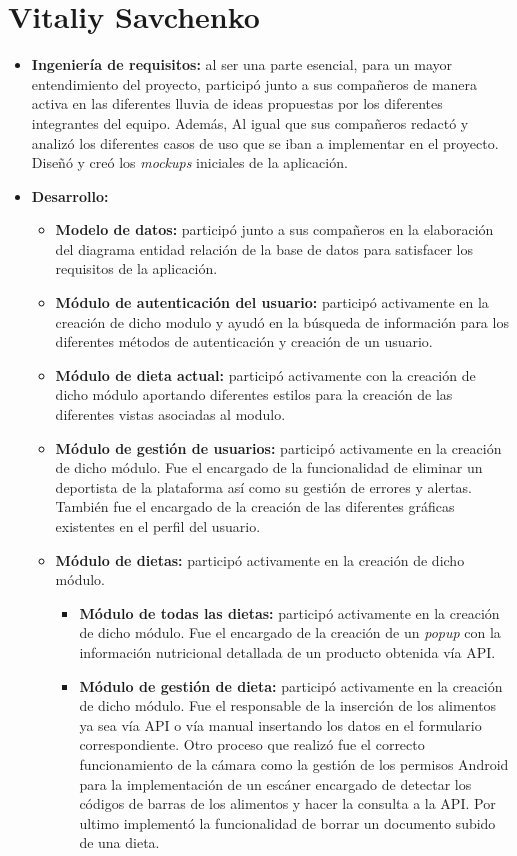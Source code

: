 \section{Vitaliy Savchenko}
\begin{itemize}
    \item \textbf{Ingeniería de requisitos:} al ser una parte esencial, para un mayor entendimiento del proyecto, participó junto a sus compañeros de manera activa en las diferentes lluvia de ideas propuestas por los diferentes integrantes del equipo. Además, Al igual que sus compañeros redactó y analizó los diferentes casos de uso que se iban a implementar en el proyecto. Diseñó y creó los \textit{mockups} iniciales de la aplicación.
    \item \textbf{Desarrollo:}
        \begin{itemize}
            \item \textbf{Modelo de datos:} participó junto a sus compañeros en la elaboración del diagrama entidad relación de la base de datos para satisfacer los requisitos de la aplicación.
            \item \textbf{Módulo de autenticación del usuario:} participó activamente en la creación de dicho modulo y ayudó en la búsqueda de información para los diferentes métodos de autenticación y creación de un usuario.
            \item \textbf{Módulo de dieta actual:} participó activamente con la creación de dicho módulo aportando diferentes estilos para la creación de las diferentes vistas asociadas al modulo.
            \item \textbf{Módulo de gestión de usuarios:} participó activamente en la creación de dicho módulo. Fue el encargado de la funcionalidad de eliminar un deportista de la plataforma así como su gestión de errores y alertas. También fue el encargado de la creación de las diferentes gráficas existentes en el perfil del usuario.
            \item \textbf{Módulo de dietas:} participó activamente en la creación de dicho módulo.
            \begin{itemize}
                \item \textbf{Módulo de todas las dietas:} participó activamente en la creación de dicho módulo. Fue el encargado de la creación de un \textit{popup} con la información nutricional detallada de un producto obtenida vía API.
                \item \textbf{Módulo de gestión de dieta:} participó activamente en la creación de dicho módulo. Fue el responsable de la inserción de los alimentos ya sea vía API o vía manual insertando los datos en el formulario correspondiente. Otro proceso que realizó fue el correcto funcionamiento de la cámara como la gestión de los permisos Android para la implementación de un escáner encargado de detectar los códigos de barras de los alimentos y hacer la consulta a la API. Por ultimo implementó la funcionalidad de borrar un documento subido de una dieta.

\end{itemize}
\end{itemize}
\end{itemize}
